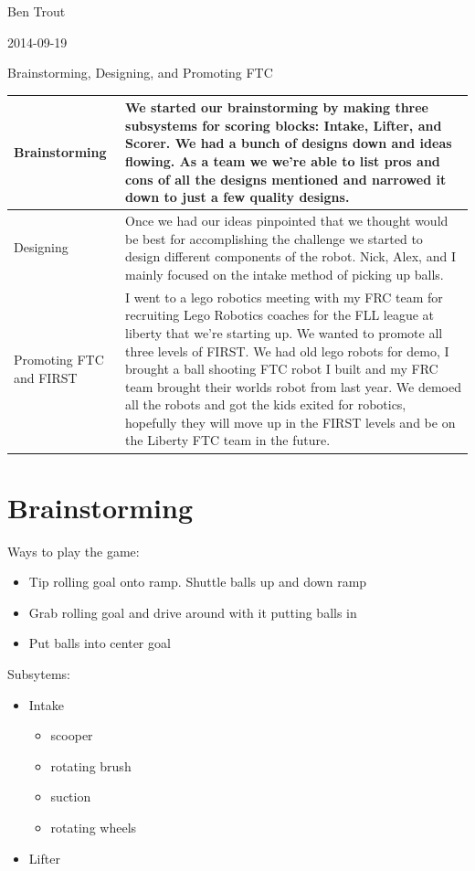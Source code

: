 Ben Trout

2014-09-19

Brainstorming, Designing, and Promoting FTC

\begin{tabular}{|p{5cm}|p{5cm}|}
 \hline
 Brainstorming&
 We started our brainstorming by making three subsystems for scoring blocks:
 Intake, Lifter, and Scorer. We had a bunch of designs down and ideas flowing.
 As a team we we’re able to list pros and cons of all the designs mentioned and narrowed
 it down to just a few quality designs.
 \\
 \hline
 Designing&
 Once we had our ideas pinpointed that we thought would be best for accomplishing
 the challenge we started to design different components of the robot.
 Nick, Alex, and I mainly focused on the intake method of picking up balls.
 \\
 \hline
 Promoting FTC and FIRST&
 I went to a lego robotics meeting with my FRC team for recruiting Lego Robotics coaches
 for the FLL league at liberty that we’re starting up. We wanted to promote all three
 levels of FIRST. We had old lego robots for demo, I brought a ball shooting FTC robot
 I built and my FRC team brought their worlds robot from last year.
 We demoed all the robots and got the kids exited for robotics, hopefully they will
 move up in the FIRST levels and be on the Liberty FTC team in the future.
 \\
 \hline
\end{tabular}

\section*{Brainstorming}
Ways to play the game:
\begin{itemize}
 \item Tip rolling goal onto ramp. Shuttle balls up and down ramp
 \item Grab rolling goal and drive around with it putting balls in
 \item Put balls into center goal %
\end{itemize}
Subsytems:
\begin{itemize}
 \item Intake
 \begin{itemize}
  \item scooper
  \item rotating brush
  \item suction
  \item rotating wheels
 \end{itemize}
 \item Lifter
\end{itemize}


